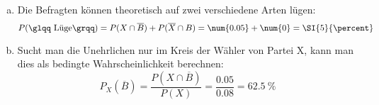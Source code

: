 \begin{exercise}
    \begin{enumerate}[a)]
      \item Die Befragten können theoretisch auf
            zwei verschiedene Arten lügen:
            \begin{equation*}
              P(\text{\glqq Lüge\grqq})
              =P(X\cap\overline{B})+P(\overline{X}\cap B)
              =\num{0.05}+\num{0}=\SI{5}{\percent}
            \end{equation*}
      \item Sucht man die Unehrlichen nur im Kreis
            der Wähler von Partei X, kann man dies
            als bedingte Wahrscheinlichkeit
            berechnen:
            \begin{equation*}
              P_{X}(\overline{B})
              =\frac{P(X\cap\overline{B})}{P(X)}
              =\frac{\num{0.05}}{\num{0.08}}
              =\SI{62.5}{\percent}
            \end{equation*}
    \end{enumerate}
  \fi
\end{exercise}
